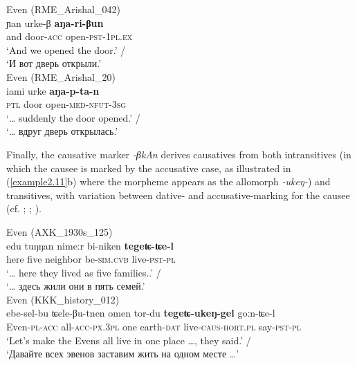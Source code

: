 \documentclass[output=paper,colorlinks,citecolor=brown]{langscibook}
\begin{document}
\pagebreak

\ea
    \label{example2.10}
    \ea
     Even (RME\_Arishal\_042)\\
    \gll ɲan	urke-β	\textbf{aŋa-ri-βun}\\
    and	door-\textsc{acc}	open-\textsc{pst-1pl.ex}\\
    \glt ‘And we opened the door.’ /\\‘И вот дверь открыли.’\\

\ex
     Even (RME\_Arishal\_20)\\
    \gll iami	urke	\textbf{aŋa-p-ta-n}\\
    \textsc{ptl}	door	open-\textsc{med-nfut-3sg}\\
    \glt ‘… suddenly the door opened.’ /\\‘… вдруг дверь открылась.’\\
    \z
\z

Finally, the causative marker \textit{-βkAn} derives causatives from both intransitives (in which the causee is marked by the accusative case, as illustrated in (\ref{example2.11}b) where the morpheme appears as the allomorph \textit{-ukeŋ-}) and transitives, with variation between dative- and accusative-marking for the causee (cf. \citealt[11]{Nedjalkov}; \citealt[207]{Pevnov2007}; \citealt[302]{Pakendorf2020}).

\ea
    \label{example2.11}
    \ea
     Even (AXK\_1930s\_125)\\
    \gll edu	tuŋŋan	nimeːr	bi-niken	\textbf{tegeʨ-ʨe-l}\\
    here	five	neighbor	be-\textsc{sim.cvb}	live-\textsc{pst-pl}\\
    \glt ‘… here they lived as five families..’ /\\‘… здесь жили они в пять семей.’\\

\ex
     Even (KKK\_history\_012)\\
    \gll ebe-sel-bu	ʨele-βu-tnen	omen    tor-du	\textbf{tegeʨ-ukeŋ-gel}	goːn-ʨe-l\\
    Even-\textsc{pl-acc}	all-\textsc{acc-px.3pl}	one earth-\textsc{dat}	live-\textsc{caus-hort.pl}	say-\textsc{pst-pl}\\
    \glt ‘Let's make the Evens all live in one place …, they said.’ /\\‘Давайте всех эвенов заставим жить на одном месте …’\\
    \z
\z
\end{document}
